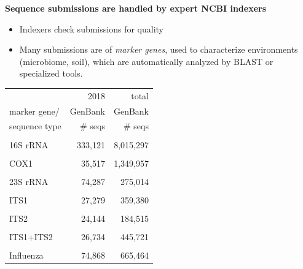\documentclass[landscape]{slides}
\begin{document}
\begin{slide}
\begin{center}
\textbf{Sequence submissions are handled by expert NCBI indexers}
\end{center}

\small
\begin{itemize}
\item Indexers check submissions for quality
\item Many submissions are of \emph{marker genes}, used to
  characterize environments (microbiome, soil), which are
  automatically analyzed by BLAST or specialized tools.
\end{itemize}

\medskip

\begin{center}
\begin{tabular}{lrr}
                                 &    2018  & total     \\
 marker gene/                    &  GenBank & GenBank   \\
 sequence type                   &  \# seqs & \# seqs   \\ \hline
& & \\
16S rRNA                        & 333,121  & 8,015,297 \\
& & \\                    
 COX1                            & 35,517  & 1,349,957  \\
& & \\                    
 23S rRNA                        & 74,287  &   275,014  \\
& & \\
 ITS1                            & 27,279  &   359,380  \\
& & \\                    
 ITS2                            & 24,144  &   184,515  \\
& & \\                    
 ITS1+ITS2                       & 26,734  &   445,721  \\
& & \\                    
 Influenza                       & 74,868  &   665,464  \\
\end{tabular}
\end{center}
\vfill
\end{slide}
\end{document}
